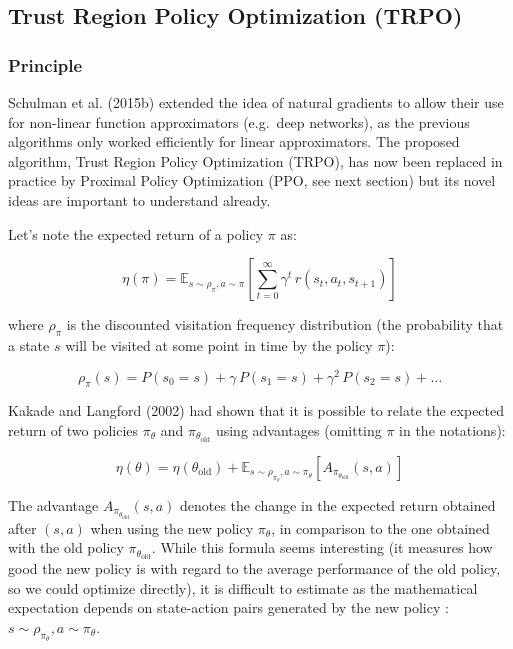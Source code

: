 \documentclass[
  letterpaper,
  DIV=11,
  numbers=noendperiod]{scrreprt}
\begin{document}
\hypertarget{trust-region-policy-optimization-trpo}{%
\subsection{Trust Region Policy Optimization
(TRPO)}\label{trust-region-policy-optimization-trpo}}

\hypertarget{principle}{%
\subsubsection*{Principle}\label{principle}}

Schulman et al. (2015b) extended the idea of natural gradients to allow
their use for non-linear function approximators (e.g.~deep networks), as
the previous algorithms only worked efficiently for linear
approximators. The proposed algorithm, Trust Region Policy Optimization
(TRPO), has now been replaced in practice by Proximal Policy
Optimization (PPO, see next section) but its novel ideas are important
to understand already.

Let's note the expected return of a policy \(\pi\) as:

\[
    \eta(\pi) = \mathbb{E}_{s \sim \rho_\pi, a \sim \pi}[\sum_{t=0}^\infty \gamma^t \, r(s_t, a_t, s_{t+1})]
\]

where \(\rho_\pi\) is the discounted visitation frequency distribution
(the probability that a state \(s\) will be visited at some point in
time by the policy \(\pi\)):

\[
    \rho_\pi(s) = P(s_0=s) + \gamma \, P(s_1=s) + \gamma^2 \, P(s_2=s) + \ldots
\]

Kakade and Langford (2002) had shown that it is possible to relate the
expected return of two policies \(\pi_\theta\) and
\(\pi_{\theta_\text{old}}\) using advantages (omitting \(\pi\) in the
notations):

\[
    \eta(\theta) = \eta(\theta_\text{old}) + \mathbb{E}_{s \sim \rho_{\pi_\theta}, a \sim \pi_\theta} [A_{\pi_{\theta_\text{old}}}(s, a)]
\]

The advantage \(A_{\pi_{\theta_\text{old}}}(s, a)\) denotes the change
in the expected return obtained after \((s, a)\) when using the new
policy \(\pi_\theta\), in comparison to the one obtained with the old
policy \(\pi_{\theta_\text{old}}\). While this formula seems interesting
(it measures how good the new policy is with regard to the average
performance of the old policy, so we could optimize directly), it is
difficult to estimate as the mathematical expectation depends on
state-action pairs generated by the new policy :
\(s \sim \rho_{\pi_\theta}, a \sim \pi_\theta\).
\end{document}
